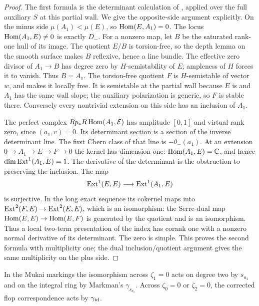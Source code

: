 \begin{proof}
The first formula is the determinant calculation of
\cite[\S7.2]{wuebben17}, applied over the full auxiliary $S$ at
this partial wall. We give the opposite-side argument explicitly.
On the minus side $\mu(A_1)<\mu(E)$, so $\operatorname{Hom}(E,A_1)=0$.
The locus $\operatorname{Hom}(A_1,E)\ne0$ is exactly $D_-$.
For a nonzero map, let $B$ be the saturated rank-one hull
of its image. The quotient $E/B$ is torsion-free, so the
depth lemma on the smooth surface makes $B$ reflexive,
hence a line bundle. The effective zero divisor of
$A_1\to B$ has degree zero by $H$-semistability of $E$;
ampleness of $H$ forces it to vanish. Thus $B=A_1$.
The torsion-free quotient $F$ is $H$-semistable of vector
$w$, and \cite[Lemma~4.1]{wuebben17} makes it locally free.
It is semistable at the partial wall because $E$ is and
$A_1$ has the same wall slope; the auxiliary polarization
is generic, so $F$ is stable there. Conversely every
nontrivial extension on this side has an inclusion of $A_1$.

The perfect complex $Rp_*R\operatorname{Hom}(A_1,\mathcal E)$ has amplitude
$[0,1]$ and virtual rank zero, since $(a_1,v)=0$. Its
determinant section is a section of the inverse determinant
line. The first Chern class of that line is
$-\theta_-(a_1)$. At an extension
$0\to A_1\to E\to F\to0$ the kernel has dimension one:
$\operatorname{Hom}(A_1,E)=\mathbb C$, and hence $\dim\operatorname{Ext}^1(A_1,E)=1$.
The derivative of the determinant is the obstruction to
preserving the inclusion. The map
\begin{equation}\label{eq:det-transverse}
 \operatorname{Ext}^1(E,E)\longrightarrow\operatorname{Ext}^1(A_1,E)
\end{equation}
is surjective. In the long exact sequence its cokernel maps
into $\operatorname{Ext}^2(F,E)\to\operatorname{Ext}^2(E,E)$, which is an isomorphism:
the Serre-dual map $\operatorname{Hom}(E,E)\to\operatorname{Hom}(E,F)$ is generated by
the quotient and is an isomorphism. Thus a local two-term
presentation of the index has corank one with a nonzero
normal derivative of its determinant. The zero is simple.
This proves the second formula with multiplicity one; the
dual inclusion/quotient argument gives the same multiplicity
on the plus side.
\end{proof}

\begin{proposition}\label{prop:marked-wall}
In the Mukai markings the isomorphism across $\zeta_1=0$
acts on degree two by $s_{a_1}$ and on the integral ring
by Markman's $\gamma_{s_{a_1}}$. Across $\zeta_0=0$ or
$\zeta_2=0$, the corrected flop correspondence acts by
$\gamma_{\operatorname{id}}$.
\end{proposition}

